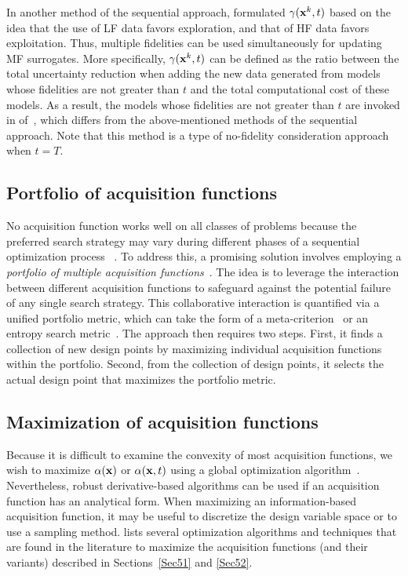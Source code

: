 \documentclass[iicol,sn-basic]{sn-jnl}%
\begin{document}
In another method of the sequential approach, \cite{Meliani2019} formulated $\gamma({\bf x}^k,t)$ based on the idea that the use of LF data favors exploration, and that of HF data favors exploitation.
Thus, multiple fidelities can be used simultaneously for updating MF surrogates.
More specifically, $\gamma({\bf x}^k,t)$ can be defined as the ratio between the total uncertainty reduction when adding the new data generated from models whose fidelities are not greater than $t$ and the total computational cost of these models.
As a result, the models whose fidelities are not greater than $t$ are invoked in  of~, which differs from the above-mentioned methods of the sequential approach.
Note that this method is a type of no-fidelity consideration approach when $t=T$.

\subsection{Portfolio of acquisition functions}\label{Sec53}

No acquisition function works well on all classes of problems because the preferred search strategy may vary during different phases of a sequential optimization process ~\citep{Shahriari2016}.
To address this, a promising solution involves employing a \textit{portfolio of multiple acquisition functions}~\citep{Hoffman2014,Shahriari2014}.
The idea is to leverage the interaction between different acquisition functions to safeguard against the potential failure of any single search strategy.
This collaborative interaction is quantified via a unified portfolio metric, which can take the form of a meta-criterion~\citep{Hoffman2014} or an entropy search metric~\citep{Shahriari2014}.
The approach then requires two steps.
First, it finds a collection of new design points by maximizing individual acquisition functions within the portfolio.
Second, from the collection of design points, it selects the actual design point that maximizes the portfolio metric.

\subsection{Maximization of acquisition functions}\label{Sec54}

Because it is difficult to examine the convexity of most acquisition functions, we wish to maximize $\alpha({\bf x})$ or $\alpha({\bf x},t)$ using a global optimization algorithm~\citep{Neumaier2004}.
Nevertheless, robust derivative-based algorithms can be used if an acquisition function has an analytical form.
When maximizing an information-based acquisition function, it may be useful to discretize the design variable space or to use a sampling method.
 lists several optimization algorithms and techniques that are found in the literature to maximize the acquisition functions (and their variants) described in Sections~\ref{Sec51} and \ref{Sec52}.
\end{document}

